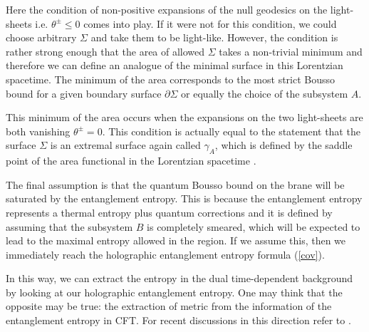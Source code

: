 \documentclass[12pt]{article}
\begin{document}
Here the condition of non-positive expansions of the null geodesics
on the light-sheets i.e. $\theta^\pm \leq 0$ comes into play. If
it were not for this condition, we could choose arbitrary $\Sigma$ and
take them to be light-like. However, the condition is rather
strong enough that the area of allowed $\Sigma$ takes a non-trivial
minimum and therefore we can define an analogue of the minimal
surface in this Lorentzian spacetime. The minimum of the area
corresponds to the most strict Bousso bound for a given boundary
surface $\partial \Sigma$ or equally the choice of the subsystem
$A$.

This minimum of the area occurs when the expansions on the two
light-sheets are both vanishing $\theta^\pm=0$. This condition is
actually equal to the statement that the surface $\Sigma$ is an
extremal surface again called $\gamma_A$, which is defined by the
saddle point of the area functional in the Lorentzian spacetime
\cite{Hubeny:2007xt}.

The final assumption is that the quantum Bousso bound on the brane
will be saturated by the entanglement entropy. This is because
 the entanglement entropy represents a thermal entropy
plus quantum corrections and it is defined by assuming that the
subsystem $B$ is completely smeared, which will be expected to lead
to the maximal entropy allowed in the region. If we assume this,
then we immediately reach the holographic entanglement entropy
formula (\ref{cov}).

In this way, we can extract the entropy in the dual
time-dependent background
by looking at our holographic entanglement entropy.
One may think that the opposite may be true: the extraction of metric from the information of
the entanglement entropy in CFT. For recent discussions in this direction refer to
\cite{Hammersley:2007ab,Bilson:2008ab}.
\end{document}
